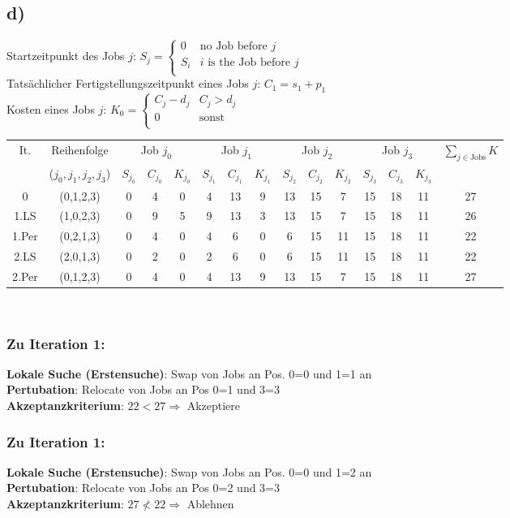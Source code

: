 \documentclass[12pt]{article}
\begin{document}
	\subsection*{d)}
		Startzeitpunkt des Jobs $j$: $S_j= \begin{cases}
		0 & \text{no Job before } j\\
		S_i & i \text{ is the Job before } j\\
		\end{cases}$ \\
		Tatsächlicher Fertigstellungszeitpunkt eines Jobs $j$: $C_1=s_1+p_1$ \\
		Kosten eines Jobs $j$: $K_0=\begin{cases}
		C_j-d_j & C_j>d_j \\
		0 & \text{sonst}\\
		\end{cases}$\newline
		\begin{tabular}{c | c || ccc || ccc || ccc || ccc ||c }
			It. & Reihenfolge & \multicolumn{3}{|c||}{Job $j_0$} & \multicolumn{3}{|c||}{Job $j_1$} & \multicolumn{3}{|c||}{Job $j_2$} & \multicolumn{3}{|c||}{Job $j_3$} & $\sum_{j\in \text{Jobs}} K$\\
			& ($j_0,j_1,j_2,j_3$) &  $S_{j_0}$ & $C_{j_0}$ & $K_{j_0}$ & $S_{j_1}$ & $C_{j_1}$ & $K_{j_1}$ & $S_{j_2}$ & $C_{j_2}$ & $K_{j_2}$ & $S_{j_3}$ & $C_{j_3}$ & $K_{j_3}$ & \\ \hline
			0 & (0,1,2,3) & 0 & 4 & 0 & 4 & 13 & 9 & 13 & 15 & 7 & 15 & 18 & 11 & 27\\
			1.LS & (1,0,2,3) & 0 & 9 & 5 & 9 & 13 & 3 & 13 & 15 & 7 & 15 & 18 & 11 & 26\\
			1.Per & (0,2,1,3) & 0 & 4 & 0 & 4 & 6 & 0 & 6 & 15 & 11 & 15 & 18 & 11 & 22\\
			2.LS & (2,0,1,3) & 0 & 2 & 0 & 2 & 6 & 0 & 6 & 15 & 11 & 15 & 18 & 11 & 22\\
			2.Per & (0,1,2,3) & 0 & 4 & 0 & 4 & 13 & 9 & 13 & 15 & 7 & 15 & 18 & 11 & 27\\
		\end{tabular}\\
	
		\subsubsection*{Zu Iteration 1:}
		\textbf{Lokale Suche (Erstensuche)}: Swap von Jobs an Pos. 0=0 und 1=1 an\\
		\textbf{Pertubation}: Relocate von Jobs an Pos 0=1 und 3=3\\
		\textbf{Akzeptanzkriterium}: $22 < 27 \Rightarrow$ Akzeptiere 
		
		\subsubsection*{Zu Iteration 1:}
		\textbf{Lokale Suche (Erstensuche)}: Swap von Jobs an Pos. 0=0 und 1=2 an\\
		\textbf{Pertubation}: Relocate von Jobs an Pos 0=2 und 3=3\\
		\textbf{Akzeptanzkriterium}: $27 \not < 22 \Rightarrow$  Ablehnen
\end{document}
